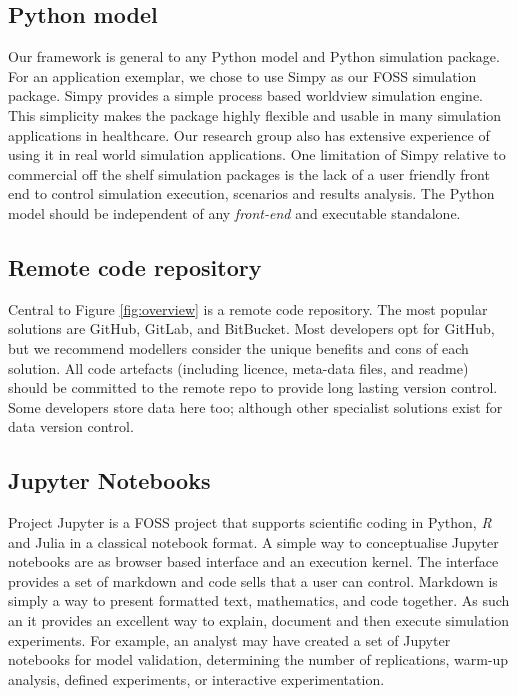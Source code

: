 \documentclass{swpaperproc}
\theoremstyle{sw}
\begin{document}
\subsection{Python model}
Our framework is general to any Python model and Python simulation package. For an application exemplar, we chose to use Simpy as our FOSS simulation package. Simpy provides a simple process based worldview simulation engine.  This simplicity makes the package highly flexible and usable in many simulation applications in healthcare. Our research group also has extensive experience of using it in real world simulation applications. One limitation of Simpy relative to commercial off the shelf simulation packages is the lack of a user friendly front end to control simulation execution, scenarios and results analysis.  The Python model should be independent of any \textit{front-end} and executable standalone.

\subsection{Remote code repository}
Central to Figure \ref{fig:overview} is a remote code repository.  The most popular solutions are GitHub, GitLab, and BitBucket.  Most developers opt for GitHub, but we recommend modellers consider the unique benefits and cons of each solution.  All code artefacts (including licence, meta-data files, and readme) should be committed to the remote repo to provide long lasting version control.  Some developers store data here too; although other specialist solutions exist for data version control.

\subsection{Jupyter Notebooks}
Project Jupyter is a FOSS project that supports scientific coding in Python, \textit{R} and Julia in a classical notebook format.  A simple way to conceptualise Jupyter notebooks are as browser based interface and an execution kernel.  The interface provides a set of markdown and code sells that a user can control. Markdown is simply a way to present formatted text, mathematics, and code together. As such an it provides an excellent way to explain, document and then execute simulation experiments. For example, an analyst may have created a set of Jupyter notebooks for model validation, determining the number of replications, warm-up analysis, defined experiments, or interactive experimentation.  
\end{document}
